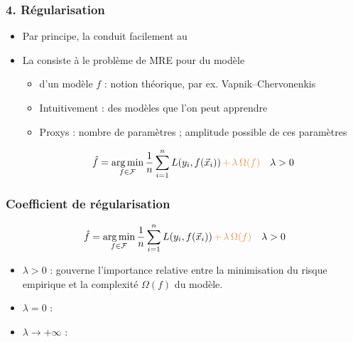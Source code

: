 \begin{frame}
  \frametitle{4. Régularisation}
  \begin{itemize}
  \item Par principe, la  conduit facilement au 
  \item La  consiste à  le problème de MRE pour
     du modèle
    \begin{itemize}
    \item {} d'un modèle $f$ : notion théorique, par ex. Vapnik--Chervonenkis
    \item Intuitivement :  des modèles que l'on peut apprendre
    \item Proxys  : nombre de paramètres ; amplitude possible de ces paramètres
    \end{itemize}
    \[ \hat{f} = \argmin_{f \in \fcal} \frac1n \sum_{i=1}^n L(y_i, f(\xvec_i))
      {\color{MyOrange} \, + \, \lambda \, \Omega(f) } \hspace{1em} \lambda > 0
    \]
  \end{itemize}
\end{frame}

\begin{frame}
  \frametitle{Coefficient de régularisation}
  \[ \hat{f} = \argmin_{f \in \fcal} \frac1n \sum_{i=1}^n L(y_i, f(\xvec_i))
    {\color{MyOrange} \, + \, \lambda \, \Omega(f) } \hspace{1em} \lambda > 0
  \]
  \begin{itemize}
  \item {} $\lambda > 0$ :
     gouverne l'importance relative entre la
    minimisation du risque empirique et la complexité $\Omega(f)$ du modèle.
  \end{itemize}
  
  \begin{itemize}
  \item $\lambda = 0$ :
  \item $\lambda \to +\infty$ :
  \end{itemize}
\end{frame}


